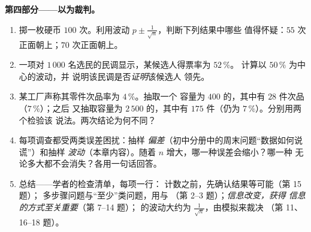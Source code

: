 \begin{problem}
\medskip
\noindent\textbf{第四部分——以为裁判。}
\begin{enumerate}[resume]
  \item 掷一枚硬币 $100$ 次。利用波动
        $p \pm \frac{1}{\sqrt n}$，判断下列结果中哪些
        值得怀疑：$55$ 次正面朝上；$70$
        次正面朝上。
  \item 一项对 $1\,000$ 名选民的民调显示，某候选人得票率为 $52\,\%$。
        计算以 $50\,\%$ 为中心的波动，并
        说明该民调是否\emph{证明}该候选人
        领先。
  \item 某工厂声称其零件次品率为 $4\,\%$。抽取一个
        容量为 $400$ 的，其中有 $28$ 件次品（$7\,\%$）；之后
        又抽取容量为 $2\,500$ 的，其中有 $175$ 件（仍为 $7\,\%$）。分别用两个检验该
        说法。两次结论为何不同？
  \item 每项调查都受两类误差困扰：抽样
        \emph{偏差}（初中分册中的周末问题“数据如何说谎”）和抽样
        \emph{波动}（本章内容）。随着
        $n$ 增大，哪一种误差会缩小？哪一种
        无论多大都不会消失？各用一句话回答。
  \item 总结——学者的检查清单，每项一行：
        计数之前，先确认结果等可能（第 15 题）；
        多步骤问题与“至少”类问题，用与
        （第 2--3 题）；\emph{信息改变，获得
        信息的方式至关重要}（第 7--14 题）；
        的波动大约为
        $\frac{1}{\sqrt n}$，由模拟来裁决
        （第 11、16--18 题）。
\end{enumerate}
\end{problem}
